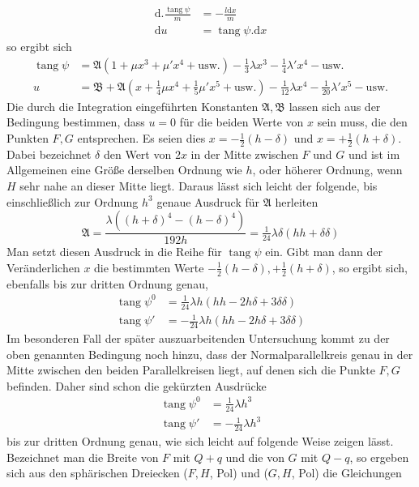 %
\[
\begin{aligned}
\mathrm{d}\mathord{.}\frac{\operatorname{tang}\psi}{m}&=-\frac{l\mathrm{d}x}{m}\\
\mathrm{d}u&=\operatorname{tang}\psi\mathord{.}\mathrm{d}x
\end{aligned}
\]
so ergibt sich
\[
\begin{aligned}
\operatorname{tang}\psi&=\mathfrak{A}(1+\mu x^3+\mu'x^4+\text{usw.})-\tfrac{1}{3}\lambda x^3-\tfrac{1}{4}\lambda'x^4-\text{usw.}\\
u&=\mathfrak{B}+\mathfrak{A}(x+\tfrac{1}{4}\mu x^4+\tfrac{1}{5}\mu'x^5+\text{usw.})-\tfrac{1}{12}\lambda x^4-\tfrac{1}{20}\lambda'x^5-\text{usw.}
\end{aligned}
\]
\indent Die durch die Integration eingeführten Konstanten \(\mathfrak{A},\mathfrak{B}\) lassen sich aus der Bedingung bestimmen, dass \(u=0\) für die beiden Werte von \(x\) sein muss, die den Punkten \(F,G\) entsprechen. Es seien dies \(x=-\tfrac{1}{2}(h-\delta)\) und \(x=+\tfrac{1}{2}(h+\delta)\). Dabei bezeichnet \(\delta\) den Wert von \(2x\) in der Mitte zwischen \(F\) und \(G\) und ist im Allgemeinen eine Größe derselben Ordnung wie \(h\), oder höherer Ordnung, wenn \(H\) sehr nahe an dieser Mitte liegt. Daraus lässt sich leicht der folgende, bis einschließlich zur Ordnung \(h^3\) genaue Ausdruck für \(\mathfrak{A}\) herleiten
\[
\mathfrak{A}=\frac{\lambda((h+\delta)^4-(h-\delta)^4)}{192h}=\tfrac{1}{24}\lambda\delta(hh+\delta\delta)
\]
\indent Man setzt diesen Ausdruck in die Reihe für \(\operatorname{tang}\psi\) ein. Gibt man dann der Veränderlichen \(x\) die bestimmten Werte \(-\tfrac{1}{2}(h-\delta),+\tfrac{1}{2}(h+\delta)\), so ergibt sich, ebenfalls bis zur dritten Ordnung genau,
\[
\begin{aligned}
\operatorname{tang}\psi^0&=\tfrac{1}{24}\lambda h(hh-2h\delta+3\delta\delta)\\
\operatorname{tang}\psi'&=-\tfrac{1}{24}\lambda h(hh-2h\delta+3\delta\delta)
\end{aligned}
\]
\indent Im besonderen Fall der später auszuarbeitenden Untersuchung kommt zu der oben genannten Bedingung noch hinzu, dass der Normalparallelkreis genau in der Mitte zwischen den beiden Parallelkreisen liegt, auf denen sich die Punkte \(F,G\) befinden. Daher sind schon die gekürzten Ausdrücke
\[
\begin{aligned}
\operatorname{tang}\psi^0&=\tfrac{1}{24}\lambda h^3\\
\operatorname{tang}\psi'&=-\tfrac{1}{24}\lambda h^3
\end{aligned}
\]
bis zur dritten Ordnung genau, wie sich leicht auf folgende Weise zeigen lässt. Bezeichnet man die Breite von \(F\) mit \(Q+q\) und die von \(G\) mit \(Q-q\), so ergeben sich aus den sphärischen Dreiecken (\(F,H\), Pol) und (\(G,H\), Pol) die Gleichungen

